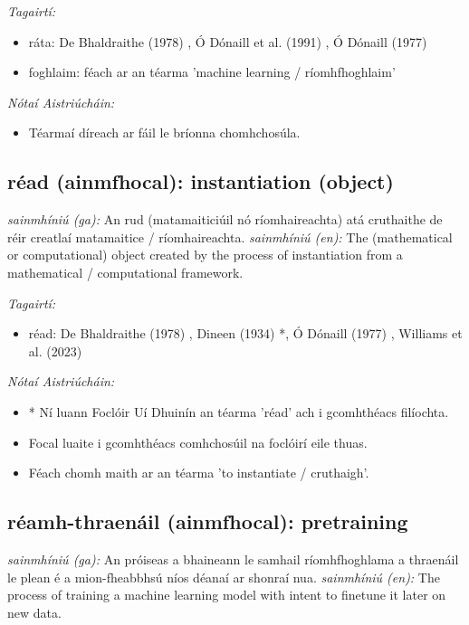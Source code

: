 \documentclass{article}
\begin{document}
 \noindent \textit{Tagairtí:}
\begin{itemize}
	\item ráta: De Bhaldraithe (1978) \cite{de-bhaldraithe}, Ó Dónaill et al. (1991) \cite{focloir-beag}, Ó Dónaill (1977) \cite{odonaill}
	\item foghlaim: féach ar an téarma 'machine learning / ríomhfhoghlaim'
\end{itemize}

 \noindent \textit{Nótaí Aistriúcháin:}
\begin{itemize}
	\item Téarmaí díreach ar fáil le bríonna chomhchosúla.
\end{itemize}


\subsection*{réad (ainmfhocal): instantiation (object)} 
 \noindent \textit{sainmhíniú (ga):} An rud (matamaiticiúil nó ríomhaireachta) atá cruthaithe de réir creatlaí matamaitice / ríomhaireachta.
\newline\newline
 \noindent \textit{sainmhíniú (en):} The (mathematical or computational) object created by the process of instantiation from a mathematical / computational framework.
\newline

 \noindent \textit{Tagairtí:}
\begin{itemize}
	\item réad: De Bhaldraithe (1978) \cite{de-bhaldraithe}, Dineen (1934) \cite{dineen}*, Ó Dónaill (1977) \cite{odonaill}, Williams et al. (2023) \cite{storchiste}
\end{itemize}

 \noindent \textit{Nótaí Aistriúcháin:}
\begin{itemize}
	\item * Ní luann Foclóir Uí Dhuinín an téarma 'réad' ach i gcomhthéacs filíochta.
	\item Focal luaite i gcomhthéacs comhchosúil na foclóirí eile thuas.
	\item Féach chomh maith ar an téarma 'to instantiate / cruthaigh'.
\end{itemize}


\subsection*{réamh-thraenáil (ainmfhocal): pretraining} 
 \noindent \textit{sainmhíniú (ga):} An próiseas a bhaineann le samhail ríomhfhoghlama a thraenáil le plean é a mion-fheabbhsú níos déanaí ar shonraí nua.
\newline\newline
 \noindent \textit{sainmhíniú (en):} The process of training a machine learning model with intent to finetune it later on new data.
\newline
\end{document}
